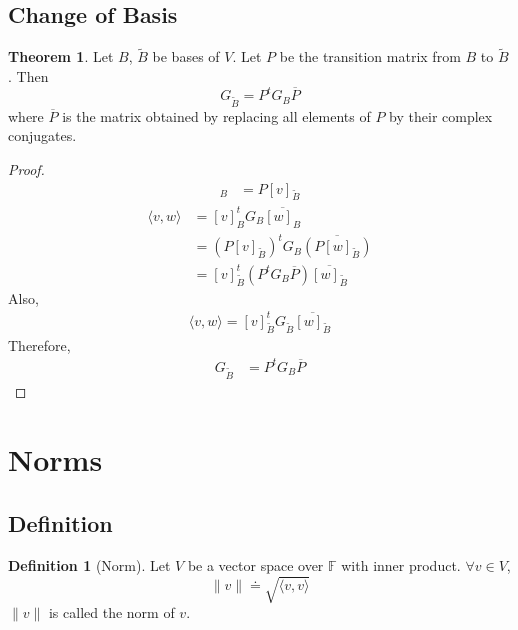 \documentclass[fleqn, a4paper, 12pt]{article}
\theoremstyle{definition}
\newtheorem{definition}{Definition} %
\theoremstyle{theorem}
\newtheorem{theorem}{Theorem} %
\theoremstyle{remark}
\numberwithin{corollary}{theorem}
\numberwithin{equation}{theorem}
\begin{document}
\subsection{Change of Basis}

\begin{theorem}
	Let $B$, $\widetilde{B}$ be bases of $V$. Let $P$ be the transition matrix from $B$ to $\widetilde{B}$. Then 
	\begin{equation*}
		G_{\widetilde{B}} = P^t G_B \overline{P}
	\end{equation*}
	where $\overline{P}$ is the matrix obtained by replacing all elements of $P$ by their complex conjugates.
\end{theorem}

\begin{proof}
	\begin{align*}
		[v]_B &= P [v]_{\widetilde{B}}
	\end{align*}
	\begin{align*}
		\langle v, w \rangle &= [v]_B^t G_B \overline{[w]_B}\\
		&= (P [v]_{\widetilde{B}})^t G_B \overline{(P [w]_{\widetilde{B}})}\\
		&= [v]_{\widetilde{B}}^t (P^t G_B \overline{P}) \overline{[w]_{\widetilde{B}}}
	\end{align*}
	Also,
	\begin{align*}
		\langle v, w \rangle = [v]_{\widetilde{B}}^t G_{\widetilde{B}} \overline{[w]_{\widetilde{B}}}
	\end{align*}
	Therefore,
	\begin{align*}
		G_{\widetilde{B}} &= P^t G_B \overline{P}
	\end{align*}
\end{proof}

\section{Norms}

\subsection{Definition}

\begin{definition}[Norm]
	Let $V$ be a vector space over $\mathbb{F}$ with inner product. $\forall v \in V$,
	\begin{equation*}
		\| v \| \doteq \sqrt{\langle v, v \rangle}
	\end{equation*}
	$\| v \|$ is called the norm of $v$.
\end{definition}
\end{document}

